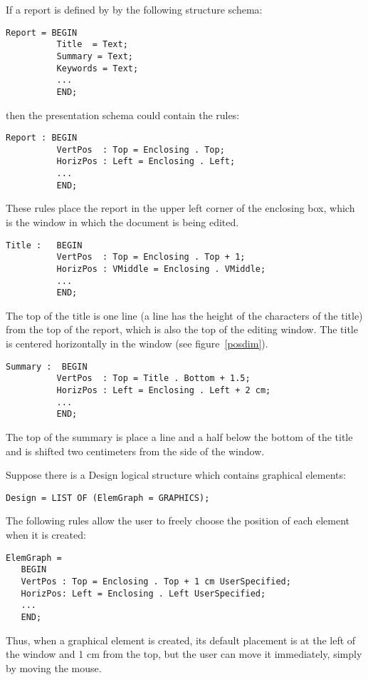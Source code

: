 \label{expos1}
\begin{example}
If a report is defined by by the following structure schema:

\begin{verbatim}
Report = BEGIN
          Title  = Text;
          Summary = Text;
          Keywords = Text;
          ...
          END;
\end{verbatim}
then the presentation schema could contain the rules:

\label{exemplerapp}
\begin{verbatim}
Report : BEGIN
          VertPos  : Top = Enclosing . Top;
          HorizPos : Left = Enclosing . Left;
          ...
          END;
\end{verbatim}
These rules place the report in the upper left corner of the enclosing
box, which is the window in which the document is being edited.

\begin{verbatim}
Title :   BEGIN
          VertPos  : Top = Enclosing . Top + 1;
          HorizPos : VMiddle = Enclosing . VMiddle;
          ...
          END;
\end{verbatim}
The top of the title is one line (a line has the height of the
characters of the title) from the top of the report, which is also the
top of the editing window.  The title is centered horizontally in the
window (see figure~\ref{posdim}).

\begin{verbatim}
Summary :  BEGIN
          VertPos  : Top = Title . Bottom + 1.5;
          HorizPos : Left = Enclosing . Left + 2 cm;
          ...
          END;
\end{verbatim}
The top of the summary is place a line and a half below the bottom of
the title and is shifted two centimeters from the side of the window.
\end{example}

\label{expos2}
\begin{example}
Suppose there is a Design logical structure which contains graphical elements:

\begin{verbatim}
Design = LIST OF (ElemGraph = GRAPHICS);
\end{verbatim}

The following rules allow the user to freely choose the position of
each element when it is created:
\begin{verbatim}
ElemGraph =
   BEGIN
   VertPos : Top = Enclosing . Top + 1 cm UserSpecified;
   HorizPos: Left = Enclosing . Left UserSpecified;
   ...
   END;
\end{verbatim}
Thus, when a graphical element is created, its default placement is at
the left of the window and 1 cm from the top, but the user can move it
immediately, simply by moving the mouse.

\end{example}

